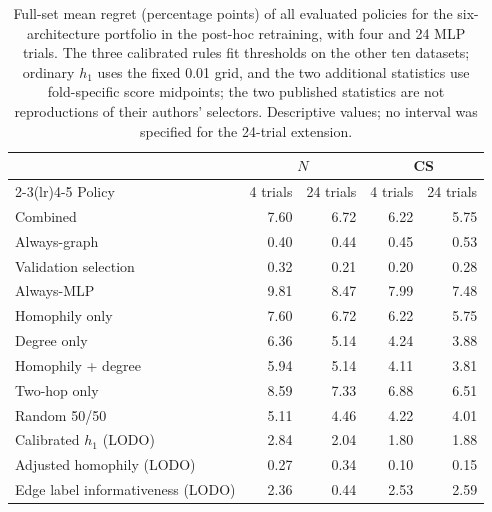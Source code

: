 \begin{table}[tbp]
\centering
\caption{Full-set mean regret (percentage points) of all evaluated policies for the six-architecture portfolio in the post-hoc retraining, with four and 24 MLP trials. The three calibrated rules fit thresholds on the other ten datasets; ordinary $h_1$ uses the fixed 0.01 grid, and the two additional statistics use fold-specific score midpoints; the two published statistics are not reproductions of their authors' selectors. Descriptive values; no interval was specified for the 24-trial extension.}
\label{tab:mlp_budget_policies}
\small
\begin{tabular}{@{}lrrrr@{}}
\toprule
 & \multicolumn{2}{c}{$N$} & \multicolumn{2}{c}{CS} \\
\cmidrule(lr){2-3}\cmidrule(lr){4-5}
Policy & 4 trials & 24 trials & 4 trials & 24 trials \\
\midrule
Combined & 7.60 & 6.72 & 6.22 & 5.75 \\
Always-graph & 0.40 & 0.44 & 0.45 & 0.53 \\
Validation selection & 0.32 & 0.21 & 0.20 & 0.28 \\
Always-MLP & 9.81 & 8.47 & 7.99 & 7.48 \\
Homophily only & 7.60 & 6.72 & 6.22 & 5.75 \\
Degree only & 6.36 & 5.14 & 4.24 & 3.88 \\
Homophily + degree & 5.94 & 5.14 & 4.11 & 3.81 \\
Two-hop only & 8.59 & 7.33 & 6.88 & 6.51 \\
Random 50/50 & 5.11 & 4.46 & 4.22 & 4.01 \\
\midrule
Calibrated $h_1$ (LODO) & 2.84 & 2.04 & 1.80 & 1.88 \\
Adjusted homophily (LODO) & 0.27 & 0.34 & 0.10 & 0.15 \\
Edge label informativeness (LODO) & 2.36 & 0.44 & 2.53 & 2.59 \\
\bottomrule
\end{tabular}
\end{table}

